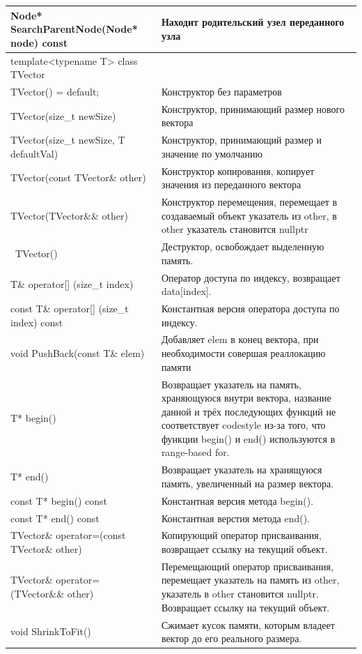 \begin{longtable}{|p{7.5cm}|p{7.5cm}|}
\hline 
Node* SearchParentNode(Node* node) const&Находит родительский узел переданного узла\\
\hline
\hline
\rowcolor{lightgray}
\multicolumn{2}{|c|} {template<typename T> class TVector}\\
\hline
TVector() = default; & Конструктор без параметров\\
\hline
TVector(size\_t newSize) & Конструктор, принимающий размер нового вектора\\
\hline
TVector(size\_t newSize, T defaultVal) &Конструктор, принимающий размер и значение по умолчанию\\
\hline 
TVector(const TVector\& other)&Конструктор копирования, копирует значения из переданного вектора\\
\hline
TVector(TVector\&\& other)& Конструктор перемещения, перемещает в создаваемый объект указатель из other, в other указатель становится nullptr\\
\hline
~TVector() & Деструктор, освобождает выделенную память.\\
\hline 
T\& operator[] (size\_t index)& Оператор доступа по индексу, возвращает data[index].\\
\hline 
const T\& operator[] (size\_t index) const& Константная версия оператора доступа по индексу.\\
\hline
void PushBack(const T\& elem)&Добавляет elem в конец вектора, при необходимости совершая реаллокацию памяти\\
\hline 
T* begin()& Возвращает указатель на память, храняющуюся внутри вектора, название данной и трёх последующих функций не соответствует codestyle из-за того, что функции begin() и end() используются в range-based for.\\
\hline 
T* end()& Возвращает указатель на хранящуюся память, увеличенный на размер вектора.\\
\hline 
const T* begin() const& Константная версия метода begin().\\
\hline
const T* end() const& Константная верстия метода end().\\
\hline 
TVector\& operator=(const TVector\& other) & Копирующий оператор присваивания, возвращает ссылку на текущий объект.\\
\hline
TVector\& operator=(TVector\&\& other)& Перемещающий оператор присваивания, перемещает указатель на память из other, указатель в other становится nullptr. Возвращает ссылку на текущий объект.\\
\hline 
void ShrinkToFit()& Сжимает кусок памяти, которым владеет вектор до его реального размера.\\

\end{longtable}
